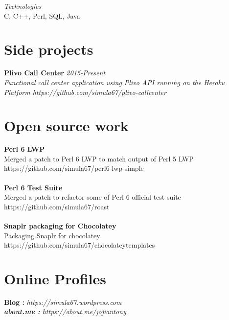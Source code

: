 \documentclass[line,margin]{res}
\begin{document}
\begin{resume}
{\it{Technologies}}\\
C, C++, Perl, SQL, Java

\section{Side projects}
{\bf Plivo Call Center} \hfill \it{2015-Present}\\
Functional call center application using Plivo API running on the Heroku Platform
https://github.com/simula67/plivo-callcenter\\


\section{Open source work}
{\bf Perl 6 LWP}\\
Merged a patch to Perl 6 LWP to match output of Perl 5 LWP\\
https://github.com/simula67/perl6-lwp-simple\\ \\
{\bf Perl 6 Test Suite}\\
Merged a patch to refactor some of Perl 6 official test suite\\
https://github.com/simula67/roast\\ \\
{\bf Snaplr packaging for Chocolatey}\\
Packaging Snaplr for chocolatey\\
https://github.com/simula67/chocolateytemplates\\

\section{Online Profiles}
{\bf Blog :} \it{https://simula67.wordpress.com} \\
{\bf about.me :} \it{https://about.me/jojiantony} \\


\end{resume}
\end{document}
